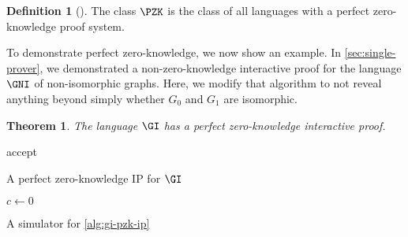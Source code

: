 \documentclass[english,12pt]{reedthesis}
\theoremstyle{plain}
\newtheorem{thm}{Theorem}[section]
\theoremstyle{definition}
\newtheorem{defn}[defn]{Definition}
\theoremstyle{remark}
\begin{document}
\begin{defn}[{\cite[Def.\ 4.3.5]{Go01}}]\label{def:pzk}
  The class $\PZK$ is the class of all languages with a perfect zero-knowledge
  proof system.
\end{defn}

To demonstrate perfect zero-knowledge, we now show an example. In
\cref{sec:single-prover}, we demonstrated a non-zero-knowledge interactive proof
for the language $\GNI$ of non-isomorphic graphs. Here, we modify that algorithm
to not reveal anything beyond simply whether $G_{0}$ and $G_{1}$ are isomorphic.

\begin{thm}\label{thm:gi-pzk-ip}
  The language $\GI$ has a perfect zero-knowledge interactive proof.
\end{thm}

\begin{algorithm}[htbp]
  accept\;
  \caption{A perfect zero-knowledge IP for $\GI$}\label{alg:gi-pzk-ip}
\end{algorithm}

\begin{algorithm}[htbp]
  $c \leftarrow 0$\;
  \KwRet{$\bot$}\;
  \caption{A simulator for \cref{alg:gi-pzk-ip}}\label{alg:gi-simulator}
\end{algorithm}
\end{document}
